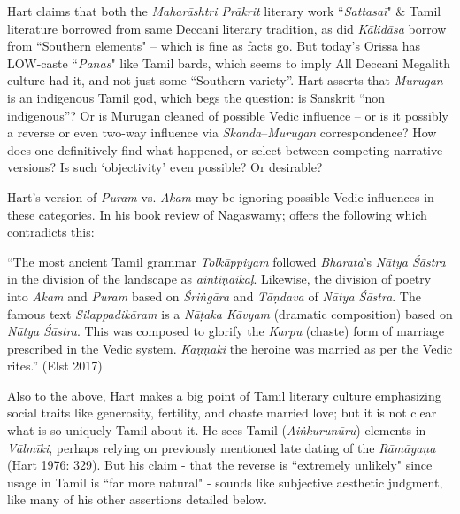 Hart claims that both the \textit{Maharāshtri Prākrit} literary work “\textit{Sattasaī}" \& Tamil literature borrowed from same Deccani literary tradition, as did \textit{Kālidāsa} borrow from “Southern elements" – which is fine as facts go. But today’s Orissa has LOW-caste “\textit{Panas}" like Tamil bards, which seems to imply All Deccani Megalith culture had it, and not just some “Southern variety”. Hart asserts that \textit{Murugan} is an indigenous Tamil god, which begs the question: is Sanskrit “non indigenous”? Or is Murugan cleaned of possible Vedic influence – or is it possibly a reverse or even two-way influence via \textit{Skanda}–\textit{Murugan} correspondence? How does one definitively find what happened, or select between competing narrative versions? Is such ‘objectivity’ even possible? Or desirable?

Hart’s version of \textit{Puram} vs. \textit{Akam} may be ignoring possible Vedic influences in these categories. In his book review of Nagaswamy; offers the following which contradicts this:

\begin{myquote}
“The most ancient Tamil grammar \textit{Tolkāppiyam} followed \textit{Bharata}’s \textit{Nātya Śāstra} in the division of the landscape as \textit{aintiṇaikaḷ}. Likewise, the division of poetry into \textit{Akam} and \textit{Puram} based on \textit{Śriṅgāra } and \textit{Tāṇdava } of \textit{Nātya Śāstra}. The famous text \textit{Silappadikāram} is a \textit{Nāṭaka Kāvyam} (dramatic composition) based on \textit{Nātya Śāstra}. This was composed to glorify the \textit{Karpu} (chaste) form of marriage prescribed in the Vedic system. \textit{Kaṇṇaki} the heroine was married as per the Vedic rites.” \hfill (Elst 2017)
\end{myquote}

Also to the above, Hart makes a big point of Tamil literary culture emphasizing social traits like generosity, fertility, and chaste married love; but it is not clear what is so uniquely Tamil about it. He sees Tamil (\textit{Aiṅkurunūru}) elements in \textit{Vālmīki}, perhaps relying on previously mentioned late dating of the \textit{Rāmāyaṇa} (Hart 1976: 329). But his claim - that the reverse is “extremely unlikely" since usage in Tamil is “far more natural" - sounds like subjective aesthetic judgment, like many of his other assertions detailed below.


